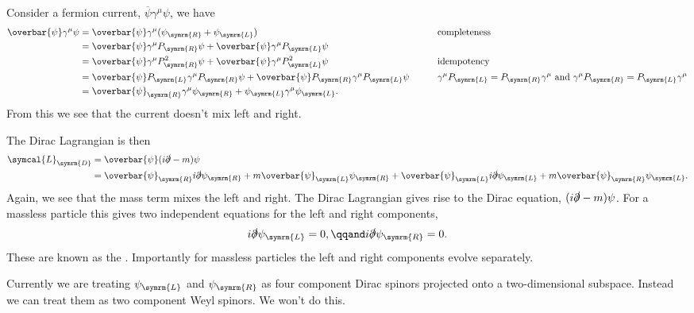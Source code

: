 \documentclass[fleqn]{NotesClass}
\newcommand{\diracadjoint}[1]{\overbar{#1}}
\newcommand{\lagrangianDensity}{\symcal{L}}
\newcommand{\Left}{\symrm{L}}
\newcommand{\Right}{\symrm{R}}
\begin{document}
    Consider a fermion current, \(\diracadjoint{\psi}\gamma^\mu \psi\), we have
    \begin{alignat}{3}
        \diracadjoint{\psi} \gamma^\mu \psi &= \diracadjoint{\psi}\gamma^\mu(\psi_{\Right} + \psi_{\Left}) \qquad && \text{completeness}\\
        &= \diracadjoint{\psi} \gamma^\mu P_{\Right}\psi + \diracadjoint{\psi} \gamma^\mu P_{\Left} \psi \qquad &&\\
        &= \diracadjoint{\psi} \gamma^\mu P_{\Right}^2\psi + \diracadjoint{\psi} \gamma^\mu P_{\Left}^2 \psi \qquad && \text{idempotency}\\
        &= \diracadjoint{\psi} P_{\Left} \gamma^\mu P_{\Right} \psi + \diracadjoint{\psi} P_{\Right} \gamma^\mu P_{\Left} \psi \qquad && \gamma^\mu P_{\Left} = P_{\Right}\gamma^\mu \text{ and } \gamma^\mu P_{\Right} = P_{\Left}\gamma^\mu\\
        &= \diracadjoint{\psi}_{\Right} \gamma^\mu \psi_{\Right} + \psi_{\Left} \gamma^\mu \psi_{\Left}. \qquad &&
    \end{alignat}
    From this we see that the current doesn't mix left and right.
    
    The Dirac Lagrangian is then
    \begin{align}
        \lagrangianDensity_{\symrm{D}} &= \diracadjoint{\psi}(i\slashed{\partial} - m)\psi\\
        &= \diracadjoint{\psi}_{\Right}i\slashed{\partial}\psi_{\Right} + m \diracadjoint{\psi}_{\Left}\psi_{\Right} + \diracadjoint{\psi}_{\Left} i\slashed{\partial} \psi_{\Left} + m \diracadjoint{\psi}_{\Right}\psi_{\Left}.
    \end{align}
    Again, we see that the mass term mixes the left and right.
    The Dirac Lagrangian gives rise to the Dirac equation, \((i\slashed{\partial} - m)\psi\).
    For a massless particle this gives two independent equations for the left and right components, 
    \begin{equation}
        i\slashed{\partial}\psi_{\Left} = 0, \qqand i\slashed{\partial}\psi_{\Right} = 0.
    \end{equation}
    These are known as the .
    Importantly for massless particles the left and right components evolve separately.
    
    Currently we are treating \(\psi_{\Left}\) and \(\psi_{\Right}\) as four component Dirac spinors projected onto a two-dimensional subspace.
    Instead we can treat them as two component Weyl spinors.
    We won't do this.
    
\end{document}
